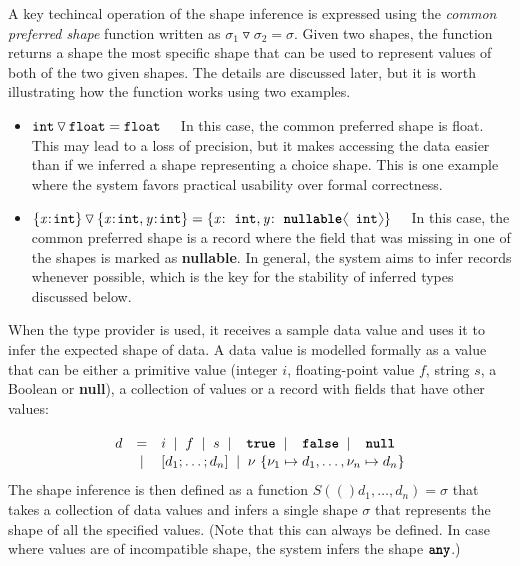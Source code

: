 \documentclass[fleqn,11pt]{report}
\newcommand{\lsep}[0]{\;\; | \;\;}
\newcommand{\kvd}[1]{\textnormal{\ttfamily\bfseries #1}}
\newcommand{\ident}[1]{\textnormal{\ttfamily #1}}
\newcommand{\langl}{\begin{picture}(4.5,7)
\put(1.1,2.5){\rotatebox{60}{\line(1,0){5.5}}}
\put(1.1,2.5){\rotatebox{300}{\line(1,0){5.5}}}
\end{picture}}
\newcommand{\rangl}{\begin{picture}(4.5,7)
\put(.9,2.5){\rotatebox{120}{\line(1,0){5.5}}}
\put(.9,2.5){\rotatebox{240}{\line(1,0){5.5}}}
\end{picture}}
\theoremstyle{definition}
\newcommand{\semalt}[1]{S(#1)}
\newenvironment{nitemize}
{ \vspace{-0.4em}
  \begin{itemize}
    \setlength{\itemsep}{5pt}
    \setlength{\parskip}{0pt}
    \setlength{\parsep}{0pt} }
{ \end{itemize}
  \vspace{-0.4em} }
\begin{document}
A key techincal operation of the shape inference is expressed using the \emph{common preferred shape}
function written as $\sigma_1 \triangledown \sigma_2 = \sigma$. Given two shapes, the function
returns a shape the most specific shape that can be used to represent values of both of the two
given shapes. The details are discussed later, but it is worth illustrating how the function works
using two examples.

\begin{nitemize}
\item $\ident{int} \,\triangledown\, \ident{float} = \ident{float}\quad$ In this case, the common
  preferred shape is \ident{float}. This may lead to a loss of precision, but it makes accessing
  the data easier than if we inferred a shape representing a choice shape. This is one example
  where the system favors practical usability over formal correctness.
\item $\{ \textit{x} \!:\! \ident{int} \} \,\triangledown\,
  \{ \textit{x} \!:\! \ident{int}, \textit{y} \!:\! \ident{int} \} =
  \{ \textit{x} \!:\! \ident{int}, \textit{y} \!:\! \kvd{nullable}\langl\ident{int}\rangl \}\quad$
  In this case, the common preferred shape is a record where the field that was missing in one
  of the shapes is marked as \kvd{nullable}. In general, the system aims to infer records whenever
  possible, which is the key for the stability of inferred types discussed below.
\end{nitemize}

When the type provider is used, it receives a sample data value and uses it to infer the expected
shape of data. A data value is modelled formally as a value that can be either a primitive value
(integer $i$, floating-point value $f$, string $s$, a Boolean or \kvd{null}), a collection of values
or a record with fields that have other values:
%
\begin{equation*}
\begin{array}{lcl}
  \\[-0.5em]
 d &=& i \lsep f \lsep s \lsep \kvd{true} \lsep \kvd{false} \lsep \kvd{null} \\[0.1em]
   &|& [d_1; \ldots; d_n] \lsep \nu~\{ \nu_1 \mapsto d_1, \ldots, \nu_n \mapsto d_n \}
\end{array}
\end{equation*}
%
The shape inference is then defined as a function $\semalt(d_1, \ldots, d_n)=\sigma$ that takes a
collection of data values and infers a single shape $\sigma$ that represents the shape of all the
specified values. (Note that this can always be defined. In case where values are of incompatible
shape, the system infers the shape $\kvd{any}$.)
\end{document}
